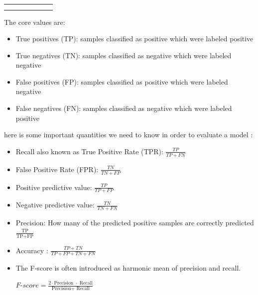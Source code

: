 \begin{table}[]
\begin{tabular}{lllclll}
                                                                                                        &                                 & \multicolumn{1}{c}{\textbf{}}                                                                      & \textbf{}                                                                                           & \multicolumn{1}{c}{\textbf{}} &  &  \\
                                                                                                        &                                 & \multicolumn{1}{c}{\textbf{}}                                                                      & \textbf{}                                                                                           & \multicolumn{1}{c}{\textbf{}} &  & 
\end{tabular}
\end{table}


The core values are:
\begin{itemize}
\item True positives (TP): samples classified as positive which were labeled positive
\item True negatives (TN): samples classified as negative which were labeled negative
\item False positives (FP): samples classified as positive which were labeled negative
\item False negatives (FN): samples classified as negative which were labeled positive
\end{itemize}

here is some important quantities we need to know in order to evaluate a model :
\begin{itemize}
\item Recall  also known as True Positive Rate (TPR): $ \frac{TP}{TP+FN}$ 
\item False Positive Rate (FPR): $\frac{TN}{TN+FP}$
\item Positive predictive value:  $\frac{TP}{TP+FP}$ 
\item Negative predictive value: $\frac{TN}{TN+FN}$
\item Precision: How many of the predicted positive samples are correctly predicted   $\frac{\text{TP}}{\text{TP} + \text{FP}}$

\item Accuracy : $\frac{TP+TN}{TP+FP+TN+FN}$

\item The F-score is often introduced as harmonic mean of precision and recall.

$F$-$score= \frac{\text{2} \cdot \text{Precision } \cdot \text{ Recall} }{ \text{Precision} + \text{ Recall}}$
\end{itemize}


